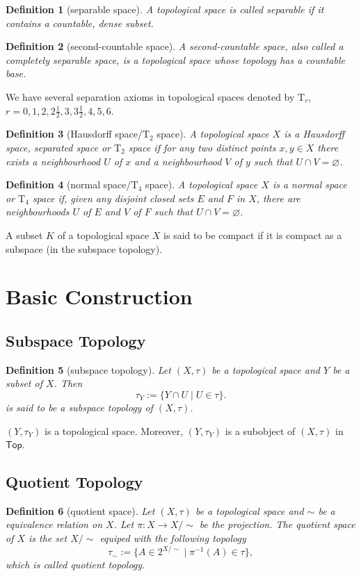 \documentclass{report}
\newtheorem{definition}{Definition}[section]
\theoremstyle{nonumberplain}
\newcommand{\Top}{\mathsf{Top}}
\begin{document}
\begin{definition}[separable space]
	A topological space is called \emph{separable} if it contains a countable, dense subset.
\end{definition}

\begin{definition}[second-countable space]
	A \emph{second-countable} space, also called a completely separable space, is a topological space whose topology has a countable base.
\end{definition}

We have several separation axioms in topological spaces denoted by $\mathrm{T}_r$, $r=0,1,2,2\frac{1}{2},3,3\frac{1}{2},4,5,6$.
\begin{definition}[Hausdorff space/$\mathrm{T}_2$ space]
	A topological space $X$ is a \emph{Hausdorff space}, separated space or $\mathrm{T}_2$ space if for any two distinct points $x,y\in X$ there exists a neighbourhood $U$ of $x$ and a neighbourhood $V$ of $y$ such that $U\cap V=\varnothing$.
\end{definition}
\begin{definition}[normal space/$\mathrm{T}_4$ space]
	A topological space $X$ is a \emph{normal space} or $\mathrm{T}_4$ space if, given any disjoint closed sets $E$ and $F$ in $X$, there are neighbourhoods $U$ of $E$ and $V$ of $F$ such that $U\cap V=\varnothing$.
\end{definition}

A subset $K$ of a topological space $X$ is said to be compact if it is compact as a subspace (in the subspace topology).
\section{Basic Construction}
\subsection{Subspace Topology}
\begin{definition}[subspace topology]
	Let $(X,\tau)$ be a topological space and $Y$ be a subset of $X$. Then
	\[
		\tau_Y:=\{Y\cap U\mid U\in \tau\}.
	\]
	is said to be a \emph{subspace topology} of $(X,\tau)$.
\end{definition}
$(Y,\tau_Y)$ is a topological space. Moreover, $(Y,\tau_Y)$ is a subobject of $(X,\tau)$ in $\Top$. 

\subsection{Quotient Topology}
\begin{definition}[quotient space]
	Let $(X,\tau)$ be a topological space and $\sim$ be a equivalence relation on $X$. Let $\pi:X\to X/\sim$ be the projection.
	The \emph{quotient space} of $X$ is the set $X/\sim$ equiped with the following topology
	\[
		\tau_\sim:=\{A\in 2^{X/\sim}\mid \pi^{-1}(A)\in \tau\},
	\]
	which is called \emph{quotient topology}.
\end{definition}
\end{document}
